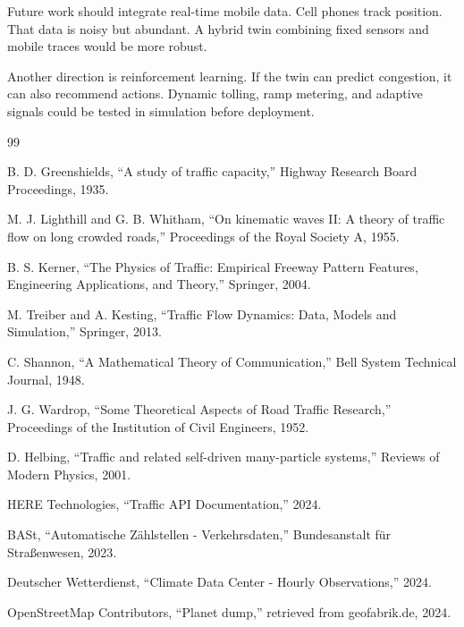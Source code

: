 \documentclass[12pt]{article}
\begin{document}
Future work should integrate real-time mobile data. Cell phones track position. That data is noisy but abundant. A hybrid twin combining fixed sensors and mobile traces would be more robust.

Another direction is reinforcement learning. If the twin can predict congestion, it can also recommend actions. Dynamic tolling, ramp metering, and adaptive signals could be tested in simulation before deployment.


\begin{thebibliography}{99}

B. D. Greenshields, ``A study of traffic capacity,'' Highway Research Board Proceedings, 1935.

M. J. Lighthill and G. B. Whitham, ``On kinematic waves II: A theory of traffic flow on long crowded roads,'' Proceedings of the Royal Society A, 1955.

B. S. Kerner, ``The Physics of Traffic: Empirical Freeway Pattern Features, Engineering Applications, and Theory,'' Springer, 2004.

M. Treiber and A. Kesting, ``Traffic Flow Dynamics: Data, Models and Simulation,'' Springer, 2013.

C. Shannon, ``A Mathematical Theory of Communication,'' Bell System Technical Journal, 1948.

J. G. Wardrop, ``Some Theoretical Aspects of Road Traffic Research,'' Proceedings of the Institution of Civil Engineers, 1952.

D. Helbing, ``Traffic and related self-driven many-particle systems,'' Reviews of Modern Physics, 2001.

HERE Technologies, ``Traffic API Documentation,'' 2024.

BASt, ``Automatische Zählstellen - Verkehrsdaten,'' Bundesanstalt für Straßenwesen, 2023.

Deutscher Wetterdienst, ``Climate Data Center - Hourly Observations,'' 2024.

OpenStreetMap Contributors, ``Planet dump,'' retrieved from geofabrik.de, 2024.

\end{thebibliography}
\end{document}
